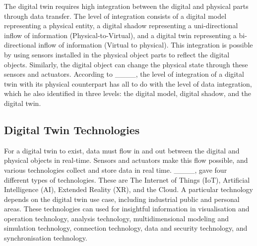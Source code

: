 The digital twin requires high integration between the digital and physical parts through data transfer. The level of integration consists of a digital model representing a physical entity, a digital shadow representing a uni-directional inflow of information (Physical-to-Virtual), and a digital twin representing a bi-directional inflow of information (Virtual to physical). This integration is possible by using sensors installed in the physical object parts to reflect the digital objects. Similarly, the digital object can change the physical state through these sensors and actuators. According to ____, the level of integration of a digital twin with its physical counterpart has all to do with the level of data integration, which he also identified in three levels: the digital model, digital shadow, and the digital twin. 
\subsection{Digital Twin Technologies}
For a digital twin to exist, data must flow in and out between the digital and physical objects in real-time. Sensors and actuators make this flow possible, and various technologies collect and store data in real time. ____, gave four different types of technologies. These are The Internet of Things (IoT), Artificial Intelligence (AI), Extended Reality (XR), and the Cloud. A particular technology depends on the digital twin use case, including industrial public and personal areas. These technologies can used for insightful information in visualisation and operation technology, analysis technology, multidimensional modeling and simulation technology, connection technology, data and security technology, and synchronisation technology. 

